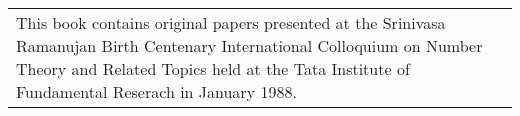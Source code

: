 ~\thispagestyle{empty}

\begin{center}
\begin{tabular}{p{7.5cm}}
This book contains original papers presented at the Srinivasa Ramanujan Birth Centenary International Colloquium on Number Theory and Related Topics held at the Tata Institute of Fundamental Reserach in January 1988.
\end{tabular}
\end{center}
